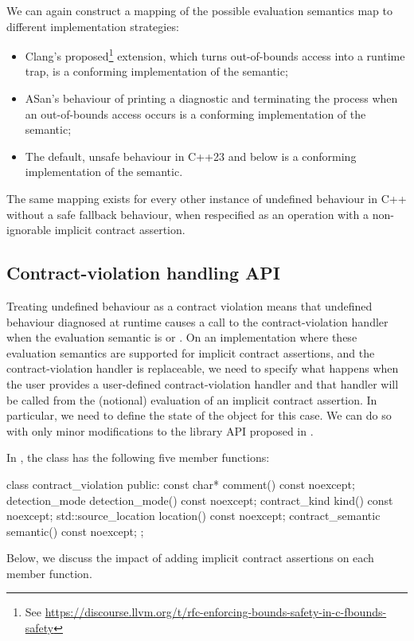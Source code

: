 We can again construct a mapping of the possible evaluation semantics map to different implementation strategies:
\begin{itemize}
\item Clang's proposed\footnote{See \url{https://discourse.llvm.org/t/rfc-enforcing-bounds-safety-in-c-fbounds-safety}}  extension, which turns out-of-bounds access into a runtime trap, is a conforming implementation of the  semantic;
\item ASan's behaviour of printing a diagnostic and terminating the process when an  out-of-bounds access occurs is a conforming implementation of the  semantic;
\item The default, unsafe behaviour in C++23 and below is a conforming implementation of the  semantic.
\end{itemize}
The same mapping exists for every other instance of undefined behaviour in C++ without a safe fallback behaviour, when respecified as an operation with a non-ignorable implicit contract assertion.

\subsection{Contract-violation handling API}

Treating undefined behaviour as a contract violation means that undefined behaviour diagnosed at runtime causes a call to the contract-violation handler when the evaluation semantic is  or . On an implementation where these evaluation semantics are supported for implicit contract assertions, and the contract-violation handler is replaceable, we need to specify what happens when the user provides a user-defined  contract-violation handler and that handler will be called from the (notional) evaluation of an implicit contract assertion. In particular, we need to define the state of the  object for this case. We can do so with only minor modifications to the library API proposed in \cite{P2900R7}. 

In \cite{P2900R7}, the  class has the following five member functions:
\begin{codeblock}
class contract_violation {
public:
  const char* comment() const noexcept;
  detection_mode detection_mode() const noexcept;
  contract_kind kind() const noexcept;
  std::source_location location() const noexcept;
  contract_semantic semantic() const noexcept;
};
\end{codeblock}
Below, we discuss the impact of adding implicit contract assertions on each member function.

